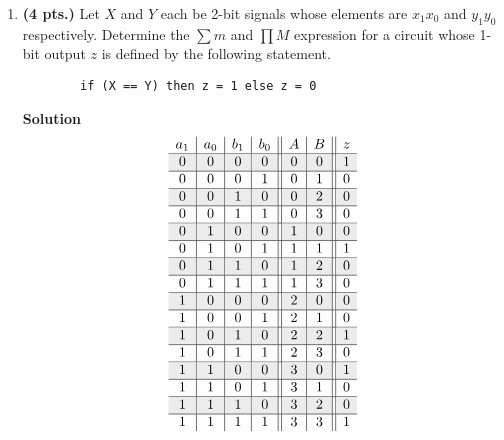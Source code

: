 \begin{enumerate}
                    \item \textbf{ (4 pts.)} Let $X$ and $Y$ each be 2-bit signals whose
                        elements are $x_1 x_0$ and $y_1 y_0$ respectively.  Determine the
                        $\sum m$ and $\prod M$ expression for a circuit whose 1-bit
                        output $z$ is defined by the following statement.
\begin{verbatim}
        if (X == Y) then z = 1 else z = 0
\end{verbatim}
                        \begin{onlysolution}  \textbf{Solution} \itshape
                            $$
                            \begin{array}{c|c|c|c||c|c||c}
                                a_1 & a_0 & b_1 & b_0 & A  & B & z  \\ \hline \rowcolor{gray!15}
                                0 & 0 & 0 & 0 & 0 & 0 & 1           \\ \hline
                                0 & 0 & 0 & 1 & 0 & 1 & 0           \\ \hline \rowcolor{gray!15}
                                0 & 0 & 1 & 0 & 0 & 2 & 0           \\ \hline
                                0 & 0 & 1 & 1 & 0 & 3 & 0           \\ \hline \rowcolor{gray!15}
                                0 & 1 & 0 & 0 & 1 & 0 & 0           \\ \hline
                                0 & 1 & 0 & 1 & 1 & 1 & 1           \\ \hline \rowcolor{gray!15}
                                0 & 1 & 1 & 0 & 1 & 2 & 0           \\ \hline
                                0 & 1 & 1 & 1 & 1 & 3 & 0           \\ \hline \rowcolor{gray!15}
                                1 & 0 & 0 & 0 & 2 & 0 & 0           \\ \hline
                                1 & 0 & 0 & 1 & 2 & 1 & 0           \\ \hline \rowcolor{gray!15}
                                1 & 0 & 1 & 0 & 2 & 2 & 1           \\ \hline
                                1 & 0 & 1 & 1 & 2 & 3 & 0           \\ \hline \rowcolor{gray!15}
                                1 & 1 & 0 & 0 & 3 & 0 & 1           \\ \hline
                                1 & 1 & 0 & 1 & 3 & 1 & 0           \\ \hline \rowcolor{gray!15}
                                1 & 1 & 1 & 0 & 3 & 2 & 0           \\ \hline
                                1 & 1 & 1 & 1 & 3 & 3 & 1           \\
                            \end{array}$$


\end{onlysolution}
\end{enumerate}
